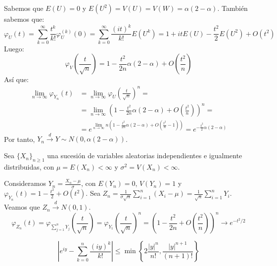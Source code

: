 \begin{exercise}
\begin{enumerate}
              Sabemos que $E(U) = 0$ y $E(U^2) = V(U) = V(W) = \alpha(2-\alpha)$.
              También sabemos que:
              $$\varphi_U(t) = \sum_{k=0}^\infty \frac{t^k}{k!} \varphi_U^{(k)}(0) = \sum_{k=0}^\infty \frac{(it)^k}{k!} E(U^k) = 1 + itE(U) - \frac{t^2}{2}E(U^2) + O(t^2)$$
              Luego:
              $$\varphi_V\left(\frac{t}{\sqrt{n}}\right) = 1 - \frac{t^2}{2n}\alpha(2-\alpha) + O\left(\frac{t^2}{n}\right)$$
              Así que:
              \begin{align*}
                  \lim\limits_{n \to \infty} \varphi_{Y_n}(t) & = \lim\limits_{n \to \infty} \varphi_U\left(\frac{t}{\sqrt{n}}\right)^n =                                                                                \\
                                                              & = \lim\limits_{n \to \infty} \left(1 - \frac{t^2}{2n}\alpha(2-\alpha) + O\left(\frac{t^2}{n}\right)\right)^n =                                           \\
                                                              & = e^{\lim\limits_{n \to \infty} n\left(1 - \frac{t^2}{2n}\alpha(2-\alpha) + O\left(\frac{t^2}{n} - 1\right)\right)} = e^{-\frac{t^2}{2}\alpha(2-\alpha)}
              \end{align*}
              Por tanto, $Y_n \xrightarrow{d} Y \sim N(0, \alpha(2-\alpha))$.
    \end{enumerate}
\end{exercise}

\begin{remark}
    Sea $\{X_n\}_{n \geq 1}$ una sucesión de variables aleatorias independientes e igualmente distribuidas, con $\mu = E(X_n) < \infty$ y $\sigma^2 = V(X_n) < \infty$.

    Consideramos $Y_n = \frac{X_n - \mu}{\sigma}$, con $E(Y_n) = 0$, $V(Y_n) = 1$ y $\varphi_{Y_n}(t) = 1 - \frac{t^2}{2} + O(t^2)$.
    Sea $Z_n = \frac{1}{\sigma\sqrt{n}} \sum_{i=1}^n (X_i - \mu) = \frac{1}{\sqrt{n}} \sum_{i=1}^n Y_i$. Veamos que $Z_n \xrightarrow{d} N(0, 1)$.
    $$\varphi_{Z_n}(t) = \varphi_{\sum_{j=1}^n Y_j} \left(\frac{t}{\sqrt{n}}\right) = \varphi_{Y_1} \left(\frac{t}{\sqrt{n}}\right)^n = \left(1 - \frac{t^2}{2n} + O\left(\frac{t^2}{n}\right)\right)^n \to e^{-t^2/2}$$
\end{remark}

\begin{lemma}
    $$\left|e^{iy} - \sum_{k=0}^n \frac{(iy)^k}{k!}\right| \leq \min\left\{2\frac{|y|^n}{n!}, \frac{|y|^{n+1}}{(n+1)!}\right\}$$
\end{lemma}

